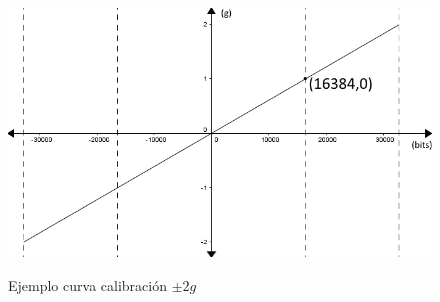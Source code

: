 \documentclass[12pt,a4paper]{article}
\begin{document}
\begin{itemize}
\begin{figure}[H]
\centering
\includegraphics[scale=0.6]{images/curvacalibracion}
\label{fig:curvacalibracion}
\caption{Ejemplo curva calibración $\pm 2g$}
\end{figure}

\end{itemize}
\end{document}
